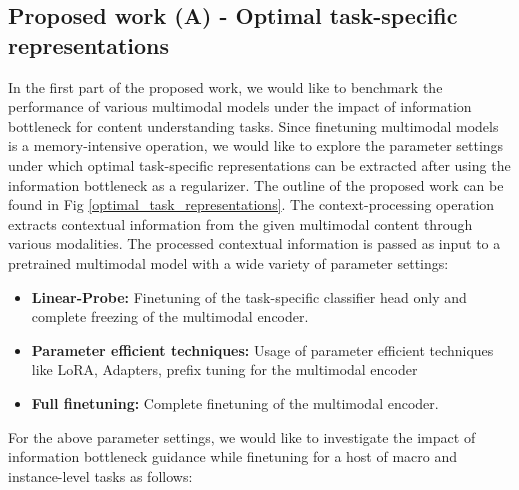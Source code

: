 \subsection{Proposed work (A) - Optimal task-specific representations}
\label{Optimal task-specific representations}
In the first part of the proposed work, we would like to benchmark the performance of various multimodal models under the impact of information bottleneck for content understanding tasks. Since finetuning multimodal models is a memory-intensive operation, we would like to explore the parameter settings under which optimal task-specific representations can be extracted after using the information bottleneck as a regularizer. The outline of the proposed work can be found in Fig \ref{optimal_task_representations}.
The context-processing operation extracts contextual information from the given multimodal content through various modalities. The processed contextual information is passed as input to a pretrained multimodal model with a wide variety of parameter settings:
\begin {itemize}
\item \textbf{Linear-Probe:} Finetuning of the task-specific classifier head only and complete freezing of the multimodal encoder.
\item \textbf{Parameter efficient techniques:} Usage of parameter efficient techniques like LoRA, Adapters, prefix tuning for the multimodal encoder
\item \textbf{Full finetuning:} Complete finetuning of the multimodal encoder.
\end{itemize}
For the above parameter settings, we would like to investigate the impact of information bottleneck guidance while finetuning for a host of macro and instance-level tasks as follows:

